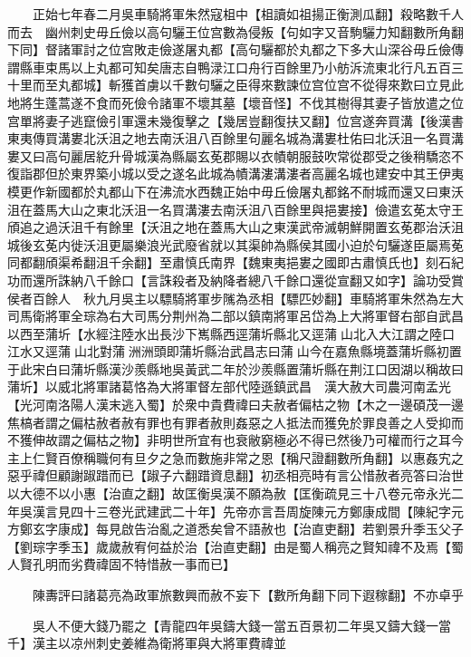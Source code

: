 　　正始七年春二月吳車騎將軍朱然寇柤中【柤讀如祖揚正衡測瓜翻】殺略數千人而去　幽州刺史毋丘儉以高句驪王位宫數為侵叛【句如字又音駒驪力知翻數所角翻下同】督諸軍討之位宫敗走儉遂屠丸都【高句驪都於丸都之下多大山深谷毋丘儉傳謂縣車束馬以上丸都可知矣唐志自鴨渌江口舟行百餘里乃小舫泝流東北行凡五百三十里而至丸都城】斬獲首虜以千數句驪之臣得來數諫位宫位宫不從得來歎曰立見此地將生蓬蒿遂不食而死儉令諸軍不壞其墓【壞音怪】不伐其樹得其妻子皆放遣之位宫單將妻子逃竄儉引軍還未幾復擊之【幾居豈翻復扶又翻】位宫遂奔買溝【後漢書東夷傳買溝婁北沃沮之地去南沃沮八百餘里句麗名城為溝婁杜佑曰北沃沮一名買溝婁又曰高句麗居紇升骨城漢為縣屬玄莬郡賜以衣幘朝服鼓吹常從郡受之後稍驕恣不復詣郡但於東界築小城以受之遂名此城為幘溝漊溝漊者高麗名城也建安中其王伊夷模更作新國都於丸都山下在沸流水西魏正始中毋丘儉屠丸都銘不耐城而還又曰東沃沮在蓋馬大山之東北沃沮一名買溝漊去南沃沮八百餘里與挹婁接】儉遣玄莬太守王頎追之過沃沮千有餘里【沃沮之地在蓋馬大山之東漢武帝滅朝鮮開置玄莬郡治沃沮城後玄莬内徙沃沮更屬樂浪光武廢省就以其渠帥為縣侯其國小迫於句驪遂臣屬焉莬同都翻頎渠希翻沮千余翻】至肅慎氏南界【魏東夷挹婁之國即古肅慎氏也】刻石紀功而還所誅納八千餘口【言誅殺者及納降者總八千餘口還從宣翻又如字】論功受賞侯者百餘人　秋九月吳主以驃騎將軍步隲為丞相【驃匹妙翻】車騎將軍朱然為左大司馬衛將軍全琮為右大司馬分荆州為二部以鎮南將軍呂岱為上大將軍督右部自武昌以西至蒲圻【水經注陸水出長沙下嶲縣西逕蒲圻縣北又逕蒲山北入大江謂之陸口江水又逕蒲山北對蒲洲洲頭即蒲圻縣治武昌志曰蒲山今在嘉魚縣境蓋蒲圻縣初置于此宋白曰蒲圻縣漢沙羨縣地吳黃武二年於沙羨縣置蒲圻縣在荆江口因湖以稱故曰蒲圻】以威北將軍諸葛恪為大將軍督左部代陸遜鎮武昌　漢大赦大司農河南孟光【光河南洛陽人漢末逃入蜀】於衆中貴費禕曰夫赦者偏枯之物【木之一邊碩茂一邊焦槁者謂之偏枯赦者赦有罪也有罪者赦則姦惡之人抵法而獲免於罪良善之人受抑而不獲伸故謂之偏枯之物】非明世所宜有也衰敝窮極必不得已然後乃可權而行之耳今主上仁賢百僚稱職何有旦夕之急而數施非常之恩【稱尺證翻數所角翻】以惠姦宄之惡乎禕但顧謝踧踖而已【踧子六翻踖資息翻】初丞相亮時有言公惜赦者亮答曰治世以大德不以小惠【治直之翻】故匡衡吳漢不願為赦【匡衡疏見三十八卷元帝永光二年吳漢言見四十三卷光武建武二十年】先帝亦言吾周旋陳元方鄭康成間【陳紀字元方鄭玄字康成】每見啟告治亂之道悉矣曾不語赦也【治直吏翻】若劉景升季玉父子【劉琮字季玉】歲歲赦宥何益於治【治直吏翻】由是蜀人稱亮之賢知禕不及焉【蜀人賢孔明而劣費禕固不特惜赦一事而已】

　　陳夀評曰諸葛亮為政軍旅數興而赦不妄下【數所角翻下同下遐稼翻】不亦卓乎

　　吳人不便大錢乃罷之【青龍四年吳鑄大錢一當五百景初二年吳又鑄大錢一當千】漢主以凉州刺史姜維為衛將軍與大將軍費禕並

